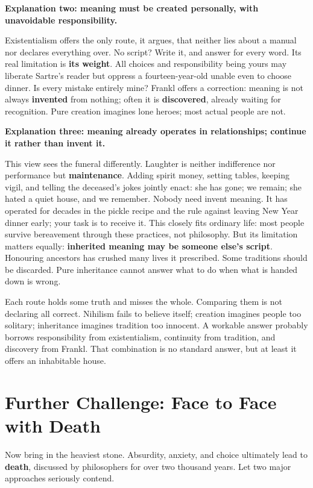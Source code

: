 \textbf{Explanation two: meaning must be created personally, with unavoidable responsibility.}

Existentialism offers the only route, it argues, that neither lies about a manual nor declares everything over. No script? Write it, and answer for every word. Its real limitation is \textbf{its weight}. All choices and responsibility being yours may liberate Sartre's reader but oppress a fourteen-year-old unable even to choose dinner. Is every mistake entirely mine? Frankl offers a correction: meaning is not always \textbf{invented} from nothing; often it is \textbf{discovered}, already waiting for recognition. Pure creation imagines lone heroes; most actual people are not.

\textbf{Explanation three: meaning already operates in relationships; continue it rather than invent it.}

This view sees the funeral differently. Laughter is neither indifference nor performance but \textbf{maintenance}. Adding spirit money, setting tables, keeping vigil, and telling the deceased's jokes jointly enact: she has gone; we remain; she hated a quiet house, and we remember. Nobody need invent meaning. It has operated for decades in the pickle recipe and the rule against leaving New Year dinner early; your task is to receive it. This closely fits ordinary life: most people survive bereavement through these practices, not philosophy. But its limitation matters equally: \textbf{inherited meaning may be someone else's script}. Honouring ancestors has crushed many lives it prescribed. Some traditions should be discarded. Pure inheritance cannot answer what to do when what is handed down is wrong.

Each route holds some truth and misses the whole. Comparing them is not declaring all correct. Nihilism fails to believe itself; creation imagines people too solitary; inheritance imagines tradition too innocent. A workable answer probably borrows responsibility from existentialism, continuity from tradition, and discovery from Frankl. That combination is no standard answer, but at least it offers an inhabitable house.

\section[Further Challenge: Facing Death]{Further Challenge: Face to Face with Death}
Now bring in the heaviest stone. Absurdity, anxiety, and choice ultimately lead to \textbf{death}, discussed by philosophers for over two thousand years. Let two major approaches seriously contend.

